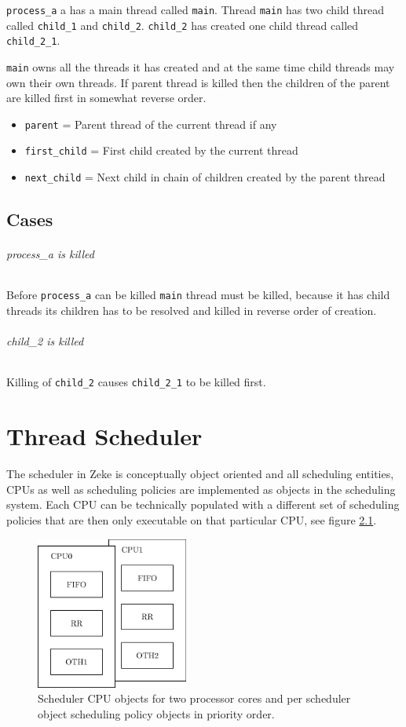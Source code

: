 \verb+process_a+ a has a main thread called \verb+main+. Thread
\verb+main+ has two child thread called \verb+child_1+ and \verb+child_2+.
\verb+child_2+ has created one child thread called \verb+child_2_1+.

\verb+main+ owns all the threads it has created and at the same time child
threads may own their own threads. If parent thread is killed then the
children of the parent are killed first in somewhat reverse order.

\begin{itemize}
  \item \verb+parent+ = Parent thread of the current thread if any
  \item \verb+first_child+ = First child created by the current thread
  \item \verb+next_child+ = Next child in chain of children created by the
        parent thread
\end{itemize}

\section{Cases}
\subparagraph*{process\_a is killed}

Before \verb+process_a+ can be killed \verb+main+ thread must be killed,
because it has child threads its children has to be resolved and killed in
reverse order of creation.

\subparagraph*{child\_2 is killed}

Killing of \verb+child_2+ causes \verb+child_2_1+ to be killed first.


\chapter{Thread Scheduler}

The scheduler in Zeke is conceptually object oriented and all
scheduling entities, CPUs as well as scheduling policies are
implemented as objects in the scheduling system. Each CPU can
be technically populated with a different set of scheduling
policies that are then only executable on that particular
CPU, see figure \ref{figure:objscheds}.

\begin{figure}
  \center
  \includegraphics[width=5cm]{proc/objscheds}
  \caption{Scheduler CPU objects for two processor cores and
           per scheduler object scheduling policy objects in
           priority order.}
  \label{figure:objscheds}
\end{figure}
